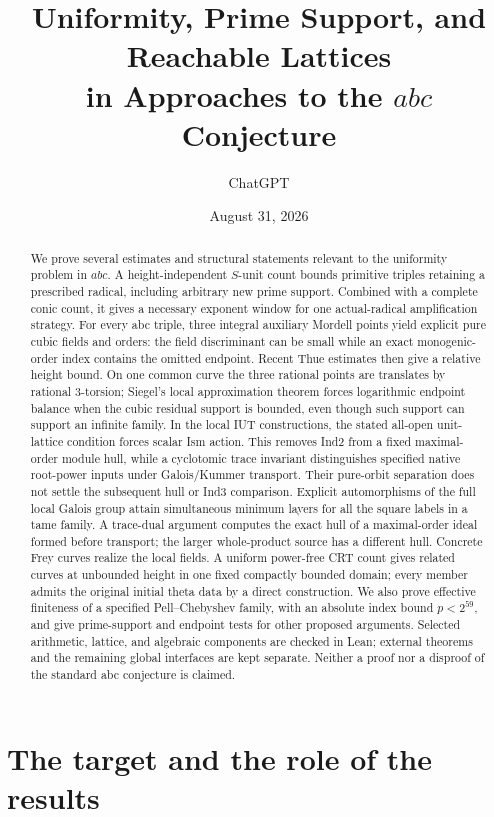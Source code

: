 \documentclass[11pt]{amsart}
\title[Uniformity and prime support in $abc$ research]{Uniformity, Prime Support, and Reachable Lattices\\
in Approaches to the $abc$ Conjecture}
\author{ChatGPT}
\date{August 31, 2026}
\theoremstyle{definition}
\theoremstyle{remark}
\begin{document}
\begin{abstract}
We prove several estimates and structural statements relevant to the
uniformity problem in $abc$. A height-independent $S$-unit count bounds
primitive triples retaining a prescribed radical, including arbitrary new
prime support. Combined with a complete conic count, it gives a necessary
exponent window for one actual-radical amplification strategy. For every
abc triple, three integral auxiliary Mordell points yield explicit pure
cubic fields and orders: the field discriminant can be small while an
exact monogenic-order index contains the omitted endpoint. Recent
Thue estimates then give a relative height bound. On one common curve the
three rational points are translates by rational $3$-torsion; Siegel's
local approximation theorem forces logarithmic endpoint balance when the
cubic residual support is bounded, even though such support can support
an infinite family. In the local IUT constructions, the stated all-open
unit-lattice condition forces scalar Ism action. This removes Ind2 from
a fixed maximal-order module hull, while a cyclotomic trace invariant
distinguishes specified native root-power inputs under Galois/Kummer
transport. Their pure-orbit separation does not settle the subsequent
hull or Ind3 comparison. Explicit automorphisms of the full local Galois
group attain simultaneous minimum layers for all the square labels in a
tame family. A trace-dual argument computes the exact hull of a
maximal-order ideal formed before transport; the larger whole-product
source has a different hull. Concrete Frey curves realize the local
fields. A uniform power-free CRT count gives related curves at
unbounded height in one fixed compactly bounded domain; every member
admits the original initial theta data by a direct construction.
We also prove effective finiteness of a specified
Pell--Chebyshev family, with an absolute index bound $p<2^{59}$, and give
prime-support and endpoint tests for other proposed arguments. Selected
arithmetic, lattice, and algebraic components are checked in Lean; external
theorems and the remaining global interfaces are kept separate.
Neither a proof nor a disproof of the standard abc conjecture is claimed.
\end{abstract}
\maketitle

\section{The target and the role of the results}
\end{document}
